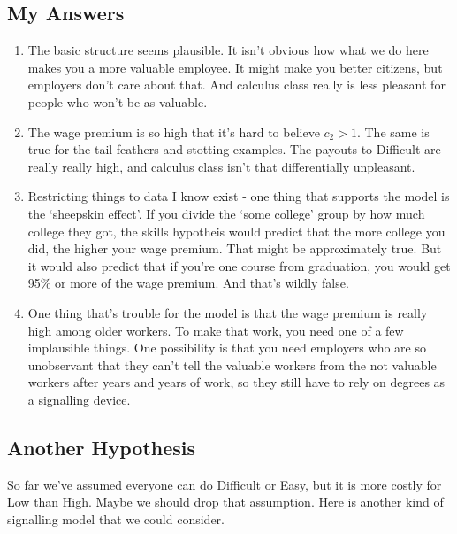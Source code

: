 \documentclass[11pt,]{article}
\providecommand{\tightlist}{%
  \setlength{\itemsep}{0pt}\setlength{\parskip}{0pt}}
\begin{document}
\hypertarget{my-answers}{%
\subsection{My Answers}\label{my-answers}}

\begin{enumerate}
\def\labelenumi{\arabic{enumi}.}
\tightlist
\item
  The basic structure seems plausible. It isn't obvious how what we do
  here makes you a more valuable employee. It might make you better
  citizens, but employers don't care about that. And calculus class
  really is less pleasant for people who won't be as valuable.
\item
  The wage premium is so high that it's hard to believe \(c_2 > 1\). The
  same is true for the tail feathers and stotting examples. The payouts
  to Difficult are really really high, and calculus class isn't that
  differentially unpleasant.
\item
  Restricting things to data I know exist - one thing that supports the
  model is the `sheepskin effect'. If you divide the `some college'
  group by how much college they got, the skills hypotheis would predict
  that the more college you did, the higher your wage premium. That
  might be approximately true. But it would also predict that if you're
  one course from graduation, you would get 95\% or more of the wage
  premium. And that's wildly false.
\item
  One thing that's trouble for the model is that the wage premium is
  really high among older workers. To make that work, you need one of a
  few implausible things. One possibility is that you need employers who
  are so unobservant that they can't tell the valuable workers from the
  not valuable workers after years and years of work, so they still have
  to rely on degrees as a signalling device.
\end{enumerate}

\newpage

\hypertarget{another-hypothesis}{%
\subsection{Another Hypothesis}\label{another-hypothesis}}

So far we've assumed everyone can do Difficult or Easy, but it is more
costly for Low than High. Maybe we should drop that assumption. Here is
another kind of signalling model that we could consider.
\end{document}
